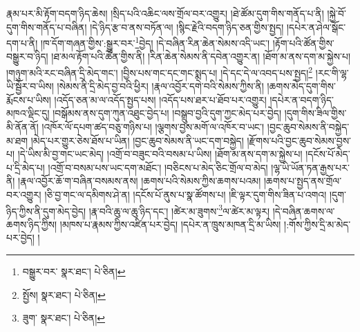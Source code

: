 རྣམ་པར་མི་རྟོག་བདག་ཉིད་ཆེས། །སྲིད་པའི་འཆིང་ལས་གྲོལ་བར་འགྱུར། །ཐེ་ཚོམ་དུག་གིས་གནོད་པ་ནི། །སྐྱེ་བོ་དུག་གིས་གནོད་པ་བཞིན། །དེ་ཉིད་རྩ་བ་ནས་བཏོན་ལ། །སྙིང་རྗེའི་བདག་ཉིད་ཅན་གྱིས་སྤྱད། །དཔེར་ན་ཤེལ་སྒོང་དག་པ་ནི། །ཁ་དོག་གཞན་གྱིས་:སྒྱུར་བར་\footnote{བསྒྱུར་བར་  སྣར་ཐང་།  པེ་ཅིན། }བྱེད། །དེ་བཞིན་རིན་ཆེན་སེམས་འདི་ཡང་། །རྟོག་པའི་ཚོན་གྱིས་བསྒྱུར་བ་ཉིད། །ཐ་མལ་རྟོག་པའི་ཚོན་གྱིས་ནི། །རིན་ཆེན་སེམས་ནི་དབེན་འགྱུར་ན། །ཐོག་མ་ནས་དག་མ་སྐྱེས་པ། །གཉུག་མའི་རང་བཞིན་དྲི་མེད་གང་། །བྱིས་པས་གང་དང་གང་སྨད་པ། །དེ་དང་དེ་ལ་འབད་པས་སྤྱད།\footnote{སྤྱོས།  སྣར་ཐང་།  པེ་ཅིན། } །རང་གི་ལྷ་ཡི་སྦྱོར་བ་ཡིས། །སེམས་ནི་དྲི་མེད་བྱ་བའི་ཕྱིར། །རྣལ་འབྱོར་དགེ་བའི་སེམས་ཀྱིས་ནི། །ཆགས་མེད་དུག་གིས་རྨོངས་པ་ཡིས། །འདོད་ཅན་མ་ལ་འདོད་སྤྱད་པས། །འདོད་པས་ཐར་པ་ཐོབ་པར་འགྱུར། །དཔེར་ན་བདག་ཉིད་མཁའ་ལྡིང་དུ། །བསྒོམས་ནས་དུག་ཀུན་འཐུང་བྱེད་པ། །བསྒྲུབ་བྱའི་དུག་ཀྱང་མེད་པར་བྱེད། །དུག་གིས་ཟིལ་གྱིས་མི་ནོན་ནོ། །འཁོར་ལོ་དཔག་ཚད་བཅུ་གཉིས་པ། །ལྕགས་བྱས་མགོ་ལ་འཁོར་བ་ཡང་། །བྱང་ཆུབ་སེམས་ནི་བསྐྱེད་མ་ཐག །མེད་པར་གྱུར་ཅེས་ཐོས་པ་ཡིན། །བྱང་ཆུབ་སེམས་ནི་ཡང་དག་བསྐྱེད། །རྫོགས་པའི་བྱང་ཆུབ་སེམས་བྱས་པ། །དེ་ཡིས་མི་བྱ་གང་ཡང་མེད། །འགྲོ་བ་བཟུང་བའི་བསམ་པ་ཡིས། །ཐོག་མ་ནས་དག་མ་སྐྱེས་པ། །དངོས་པོ་མེད་པ་དྲི་མེད་པ། །འགྲོ་བ་བསམ་པས་ཡང་དག་མཐོང་། །བཅིངས་པ་མེད་ཅིང་གྲོལ་བ་མེད། །ལྷ་ཡི་ཡོན་ཏན་རྒྱས་པར་ནི། །རྣལ་འབྱོར་ཆོ་ག་བཞིན་བསམས་ནས། །ཆགས་པའི་སེམས་ཀྱིས་ཆགས་པའམ། །ཆགས་པ་སྤྱད་ནས་གྲོལ་བར་འགྱུར། །ཅི་བྱ་གང་ལ་དམིགས་ཤེ་ན། །དངོས་པོ་ནུས་པ་སྣ་ཚོགས་པ། །ཇི་ལྟར་དུག་གིས་ཟིན་པ་འགའ། །དུག་ཉིད་ཀྱིས་ནི་དུག་མེད་བྱེད། །རྣ་བའི་ཆུ་ལ་ཆུ་ཉིད་དང་། །ཚེར་མ་ཟུགས་\footnote{ཟུག་  སྣར་ཐང་།  པེ་ཅིན། }ལ་ཚེར་མ་ལྟར། །དེ་བཞིན་ཆགས་ལ་ཆགས་ཉིད་ཀྱིས། །མཁས་པ་རྣམས་ཀྱིས་འཛིན་པར་བྱེད། །དཔེར་ན་ཁྲུས་མཁན་དྲི་མ་ཡིས། །:གོས་ཀྱིས་དྲི་མ་མེད་པར་བྱེད། །

